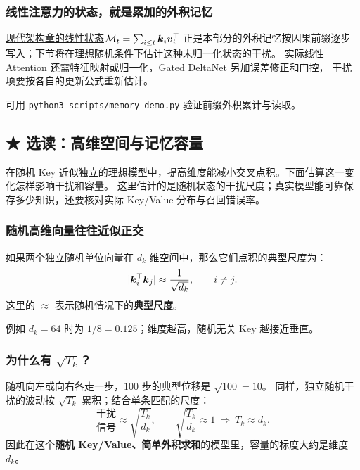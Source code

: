 
\subsubsection{线性注意力的状态，就是累加的外积记忆}

\hyperref[sec:modern-delta-rule]{现代架构章的线性状态}$\mathcal{M}_t=\sum_{i\le t}\boldsymbol{k}_i \boldsymbol{v}_i^\top$
正是本部分的外积记忆按因果前缀逐步写入；下节将在理想随机条件下估计这种未归一化状态的干扰。
实际线性 Attention 还需特征映射或归一化，Gated DeltaNet 另加误差修正和门控，
干扰项要按各自的更新公式重新估计。

可用 \texttt{python3 scripts/memory\_demo.py} 验证前缀外积累计与读取。

\subsection{\texorpdfstring{{\symboliconfont ★}}{★} 选读：高维空间与记忆容量}\label{sec:memory-capacity}


在随机 Key 近似独立的理想模型中，提高维度能减小交叉点积。下面估算这一变化怎样影响干扰和容量。
这里估计的是随机状态的干扰尺度；真实模型能可靠保存多少知识，还要核对实际 Key/Value 分布与召回错误率。

\subsubsection{随机高维向量往往近似正交}
如果两个独立随机单位向量在 $d_k$ 维空间中，那么它们点积的典型尺度为：
\begin{equation}
|\boldsymbol{k}_i^\top\boldsymbol{k}_j|\approx\frac{1}{\sqrt{d_k}},\qquad i\ne j.
\end{equation}
这里的 $\approx$ 表示随机情况下的\textbf{典型尺度}。

例如 $d_k=64$ 时为 $1/8=0.125$；维度越高，随机无关 Key 越接近垂直。

\subsubsection{为什么有 \texorpdfstring{$\sqrt{T_k}$}{记忆条数的平方根}？}
随机向左或向右各走一步，$100$ 步的典型位移是 $\sqrt{100}=10$。
同样，独立随机干扰的波动按 $\sqrt{T_k}$ 累积；结合单条匹配的尺度：
\begin{equation}
\frac{\text{干扰}}{\text{信号}}\approx\sqrt{\frac{T_k}{d_k}},\qquad
\sqrt{\frac{T_k}{d_k}}\approx1\ \Rightarrow\ T_k\approx d_k.
\end{equation}
因此在这个\textbf{随机 Key/Value、简单外积求和}的模型里，容量的标度大约是维度 $d_k$。

